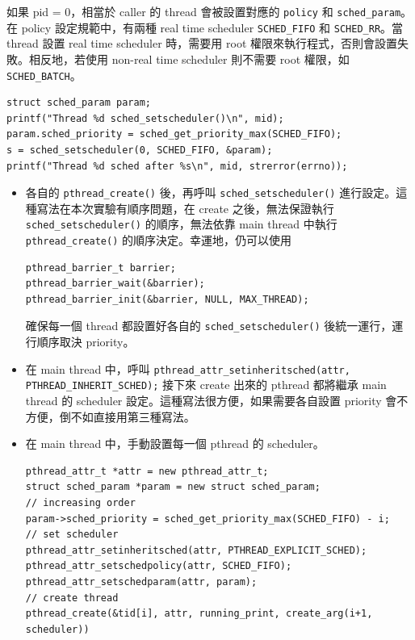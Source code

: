 \documentclass{res}
\begin{document}
\begin{resume}
\begin{itemize}
如果 pid = 0，相當於 caller 的 thread 會被設置對應的 \lstinline{policy} 和 \lstinline{sched_param}。在 policy 設定規範中，有兩種 real time scheduler \lstinline{SCHED_FIFO} 和 \lstinline{SCHED_RR}。當 thread 設置 real time scheduler 時，需要用 root 權限來執行程式，否則會設置失敗。相反地，若使用 non-real time scheduler 則不需要 root 權限，如 \lstinline{SCHED_BATCH}。

\begin{lstlisting}[frame=single]
struct sched_param param;
printf("Thread %d sched_setscheduler()\n", mid);
param.sched_priority = sched_get_priority_max(SCHED_FIFO);
s = sched_setscheduler(0, SCHED_FIFO, &param);
printf("Thread %d sched after %s\n", mid, strerror(errno));
\end{lstlisting}

\end{itemize}

\hspace*{.1in} 

\begin{itemize}
	\item 各自的 \lstinline{pthread_create()} 後，再呼叫 \lstinline{sched_setscheduler()} 進行設定。這種寫法在本次實驗有順序問題，在 create 之後，無法保證執行 \lstinline{sched_setscheduler()} 的順序，無法依靠 main thread 中執行 \lstinline{pthread_create()} 的順序決定。幸運地，仍可以使用 
	
\begin{lstlisting}
pthread_barrier_t barrier; 
pthread_barrier_wait(&barrier);
pthread_barrier_init(&barrier, NULL, MAX_THREAD);
\end{lstlisting}

確保每一個 thread 都設置好各自的 \lstinline{sched_setscheduler()} 後統一運行，運行順序取決 priority。

	\item 在 main thread 中，呼叫 \lstinline{pthread_attr_setinheritsched(attr, PTHREAD_INHERIT_SCHED);} 接下來 create 出來的 pthread 都將繼承 main thread 的 scheduler 設定。這種寫法很方便，如果需要各自設置 priority 會不方便，倒不如直接用第三種寫法。
	
	\item 在 main thread 中，手動設置每一個 pthread 的 scheduler。
	
\begin{lstlisting}[frame=single]
pthread_attr_t *attr = new pthread_attr_t;
struct sched_param *param = new struct sched_param;
// increasing order
param->sched_priority = sched_get_priority_max(SCHED_FIFO) - i;
// set scheduler
pthread_attr_setinheritsched(attr, PTHREAD_EXPLICIT_SCHED);
pthread_attr_setschedpolicy(attr, SCHED_FIFO);
pthread_attr_setschedparam(attr, param);
// create thread
pthread_create(&tid[i], attr, running_print, create_arg(i+1, scheduler))
\end{lstlisting}


\end{itemize}
\end{resume}
\end{document}
